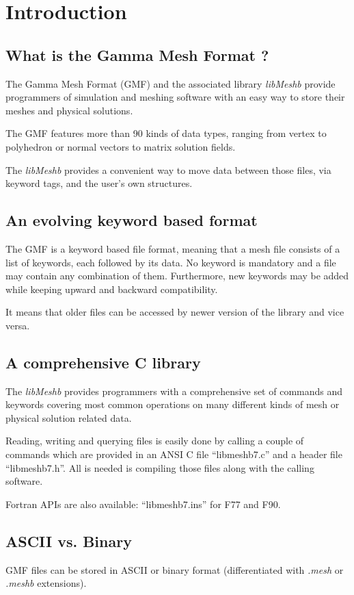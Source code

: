 \documentclass[a4paper,12pt]{article}
\begin{document}
%
%

\section{Introduction}

\subsection{What is the Gamma Mesh Format ?}
The Gamma Mesh Format (GMF) and the associated library \emph{libMeshb} provide programmers of simulation and meshing software with an easy way to store their meshes and physical solutions.

The GMF features more than 90 kinds of data types, ranging from vertex to polyhedron or normal vectors to matrix solution fields.

The \emph{libMeshb} provides a convenient way to move data between those files, via keyword tags, and the user's own structures.


\subsection{An evolving keyword based format}
The GMF is a keyword based file format, meaning that a mesh file consists of a list of keywords, each followed by its data. No keyword is mandatory and a file may contain any combination of them. Furthermore, new keywords may be added while keeping upward and backward compatibility.

It means that older files can be accessed by newer version of the library and vice versa.


\subsection{A comprehensive C library}
The \emph{libMeshb} provides programmers with a comprehensive set of commands and keywords covering most common operations on many different kinds of mesh or physical solution related data.

Reading, writing and querying files is easily done by calling a couple of commands which are provided in an ANSI C file ``libmeshb7.c'' and a header file ``libmeshb7.h''. All is needed is compiling those files along with the calling software.

Fortran APIs are also available: ``libmeshb7.ins'' for F77 and F90.


\subsection{ASCII vs. Binary}
GMF files can be stored in ASCII or binary format (differentiated with \emph{.mesh} or \emph{.meshb} extensions).
\end{document}
